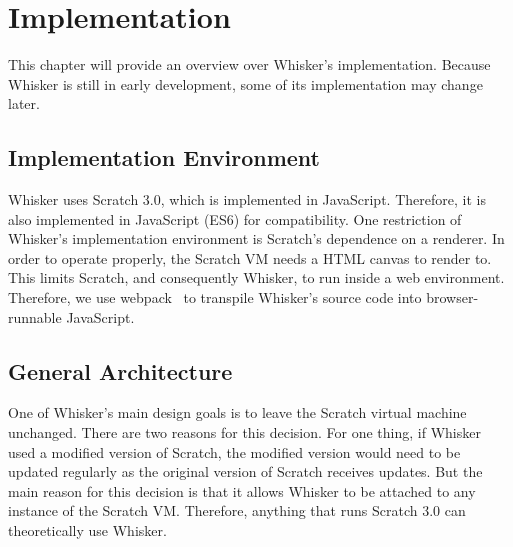 \chapter{Implementation}
\label{cha:implementation}

This chapter will provide an overview over Whisker's implementation.
Because Whisker is still in early development, some of its implementation may change later.

%
%

\section{Implementation Environment}
\label{sec:implementation_environment}

Whisker uses Scratch 3.0, which is implemented in JavaScript.
Therefore, it is also implemented in JavaScript (ES6) for compatibility.
One restriction of Whisker's implementation environment is Scratch's dependence on a renderer.
In order to operate properly, the Scratch VM needs a HTML canvas to render to.
This limits Scratch, and consequently Whisker, to run inside a web environment.
Therefore, we use webpack~\cite{webpack} to transpile Whisker's source code into browser-runnable JavaScript.

\section{General Architecture}
\label{sec:general_architecture}

One of Whisker's main design goals is to leave the Scratch virtual machine unchanged.
There are two reasons for this decision.
For one thing, if Whisker used a modified version of Scratch,
the modified version would need to be updated regularly as the original version of Scratch receives updates.
But the main reason for this decision is that it allows Whisker to be attached to any instance of the Scratch VM.
Therefore, anything that runs Scratch 3.0 can theoretically use Whisker.
\parspace

